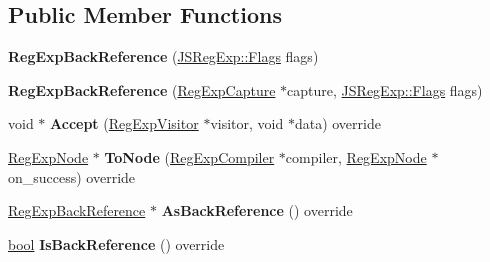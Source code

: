 \subsection*{Public Member Functions}
\begin{DoxyCompactItemize}
\item 
\mbox{\label{classv8_1_1internal_1_1RegExpBackReference_a023e6389999d31d2749f1a41a135f58f}} 
{\bfseries Reg\+Exp\+Back\+Reference} (\mbox{\hyperlink{classv8_1_1base_1_1Flags}{J\+S\+Reg\+Exp\+::\+Flags}} flags)
\item 
\mbox{\label{classv8_1_1internal_1_1RegExpBackReference_af7e3688b411e310766146587ee557284}} 
{\bfseries Reg\+Exp\+Back\+Reference} (\mbox{\hyperlink{classv8_1_1internal_1_1RegExpCapture}{Reg\+Exp\+Capture}} $\ast$capture, \mbox{\hyperlink{classv8_1_1base_1_1Flags}{J\+S\+Reg\+Exp\+::\+Flags}} flags)
\item 
\mbox{\label{classv8_1_1internal_1_1RegExpBackReference_ab901f3fcc5efcf5c220c87d805db2f46}} 
void $\ast$ {\bfseries Accept} (\mbox{\hyperlink{classv8_1_1internal_1_1RegExpVisitor}{Reg\+Exp\+Visitor}} $\ast$visitor, void $\ast$data) override
\item 
\mbox{\label{classv8_1_1internal_1_1RegExpBackReference_a073d7a0332ea2d05753f5f66ec0e0da2}} 
\mbox{\hyperlink{classv8_1_1internal_1_1RegExpNode}{Reg\+Exp\+Node}} $\ast$ {\bfseries To\+Node} (\mbox{\hyperlink{classv8_1_1internal_1_1RegExpCompiler}{Reg\+Exp\+Compiler}} $\ast$compiler, \mbox{\hyperlink{classv8_1_1internal_1_1RegExpNode}{Reg\+Exp\+Node}} $\ast$on\+\_\+success) override
\item 
\mbox{\label{classv8_1_1internal_1_1RegExpBackReference_ac30d6b7f77f05134d4597dd4b2bb765a}} 
\mbox{\hyperlink{classv8_1_1internal_1_1RegExpBackReference}{Reg\+Exp\+Back\+Reference}} $\ast$ {\bfseries As\+Back\+Reference} () override
\item 
\mbox{\label{classv8_1_1internal_1_1RegExpBackReference_afcef099457f819f81a9284448fe58b0d}} 
\mbox{\hyperlink{classbool}{bool}} {\bfseries Is\+Back\+Reference} () override

\end{DoxyCompactItemize}
